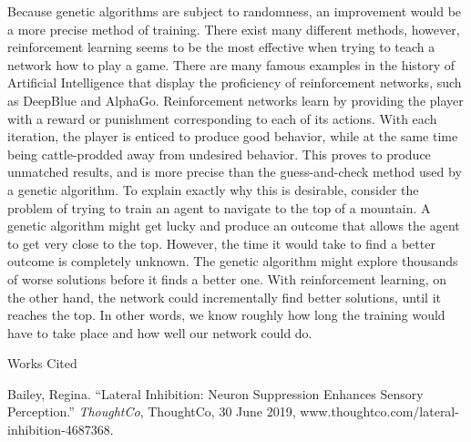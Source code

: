 \documentclass[12pt]{article}
\newcommand{\bibent}{\noindent \hangindent 40pt}
\newenvironment{workscited}{\newpage \begin{center} Works Cited \end{center}}{\newpage }
\begin{document}
\begin{flushleft}
Because genetic algorithms are subject to randomness, an improvement would be a more precise method of training. There exist many different methods, however, reinforcement learning seems to be the most effective when trying to teach a network how to play a game. There are many famous examples in the history of Artificial Intelligence that display the proficiency of reinforcement networks, such as DeepBlue and AlphaGo. 
Reinforcement networks learn by providing the player with a reward or punishment corresponding to each of its actions. With each iteration, the player is enticed to produce good behavior, while at the same time being cattle-prodded away from undesired behavior. This proves to produce unmatched results, and is more precise than the guess-and-check method used by a genetic algorithm. To explain exactly why this is desirable, consider the problem of trying to train an agent to navigate to the top of a mountain. A genetic algorithm might get lucky and produce an outcome that allows the agent to get very close to the top. However, the time it would take to find a better outcome is completely unknown. The genetic algorithm might explore thousands of worse solutions before it finds a better one. With reinforcement learning, on the other hand, the network could incrementally find better solutions, until it reaches the top. In other words, we know roughly how long the training would have to take place and how well our network could do. 

\begin{workscited}
\thispagestyle{plain}
\bibent
  Bailey, Regina. “Lateral Inhibition: Neuron Suppression Enhances Sensory Perception.” \emph{ThoughtCo}, ThoughtCo, 30 June 2019, www.thoughtco.com/lateral-inhibition-4687368.

\end{workscited}
\end{flushleft}
\end{document}
